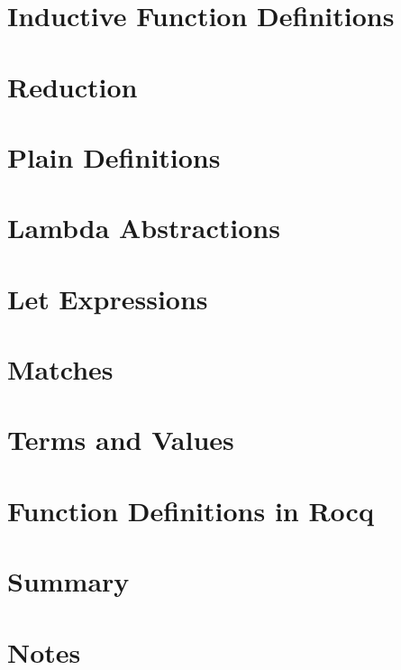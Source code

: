 \documentclass[12pt]{report}
\begin{document}
\section{Inductive Function Definitions}

\section{Reduction}

\section{Plain Definitions}

\section{Lambda Abstractions}

\section{Let Expressions}

\section{Matches}

\section{Terms and Values}

\section{Function Definitions in Rocq}

\section{Summary}

\section{Notes}

\clearpage

\appendix 
\printglossary[title=Index, toctitle=Index]
\end{document}
